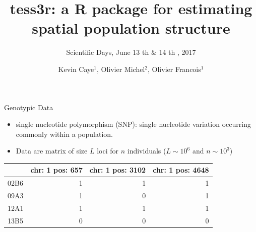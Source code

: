 \documentclass{beamer}\usepackage[]{graphicx}\usepackage[]{color}
\title{tess3r: a R package for estimating spatial population structure}
\subtitle[\ldots]{Scientific Days, June 13 th \& 14 th , 2017}
\author{Kevin Caye$^{1}$, Olivier Michel$^{2}$, Olivier Francois$^{1}$}
\institute{$^{1}$ TIMC-IMAG, $^{2}$ GIPSA-lab}
\date{}
\newenvironment{knitrout}{}{} %
\begin{document}
\frame{\titlepage} 





\begin{frame}{Genotypic Data}
\begin{itemize}
  \item single nucleotide polymorphism (SNP): single nucleotide variation
    occurring commonly within a population.
  \item Data are matrix of size $L$ loci for $n$ individuals ($L \sim 10^6$ and
    $n \sim 10^3$)
\end{itemize}

\begin{center}
\begin{knitrout}
\color{fgcolor}
\begin{tabular}{l|r|r|r}
\hline
  & chr: 1 pos: 657 & chr: 1 pos: 3102 & chr: 1 pos: 4648\\
\hline
02B6 & 1 & 1 & 1\\
\hline
09A3 & 1 & 0 & 1\\
\hline
12A1 & 1 & 1 & 1\\
\hline
13B5 & 0 & 0 & 0\\
\hline
\end{tabular}


\end{knitrout}
\end{center}

\end{frame}
\end{document}
